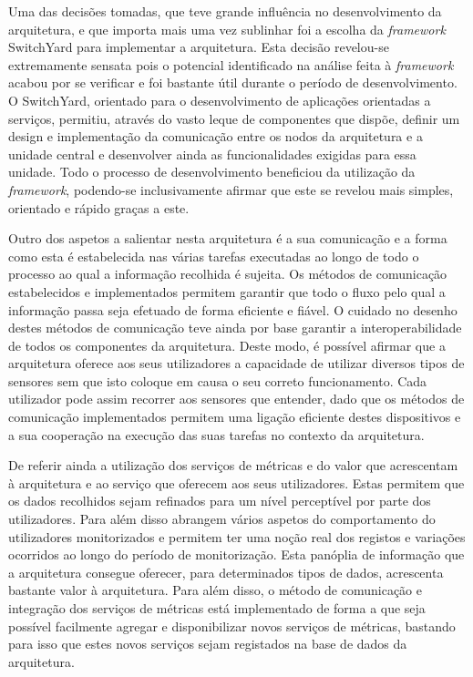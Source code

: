 Uma das decisões tomadas, que teve grande influência no desenvolvimento da arquitetura, e que importa mais uma vez sublinhar foi a escolha da \textit{framework} SwitchYard para implementar a arquitetura. Esta decisão revelou-se extremamente sensata pois o potencial identificado na análise feita à \textit{framework} acabou por se verificar e foi bastante útil durante o período de desenvolvimento. O SwitchYard, orientado para o desenvolvimento de aplicações orientadas a serviços, permitiu, através do vasto leque de componentes que dispõe, definir um design e implementação da comunicação entre os nodos da arquitetura e a unidade central e desenvolver ainda as funcionalidades exigidas para essa unidade. Todo o processo de desenvolvimento beneficiou da utilização da \textit{framework}, podendo-se inclusivamente afirmar que este se revelou mais simples, orientado e rápido graças a este.

Outro dos aspetos a salientar nesta arquitetura é a sua comunicação e a forma como esta é estabelecida nas várias tarefas executadas ao longo de todo o processo ao qual a informação recolhida é sujeita. Os métodos de comunicação estabelecidos e implementados permitem garantir que todo o fluxo pelo qual a informação passa seja efetuado de forma eficiente e fiável. O cuidado no desenho destes métodos de comunicação teve ainda por base garantir a interoperabilidade de todos os componentes da arquitetura. Deste modo, é possível afirmar que a arquitetura oferece aos seus utilizadores a capacidade de utilizar diversos tipos de sensores sem que isto coloque em causa o seu correto funcionamento. Cada utilizador pode assim recorrer aos sensores que entender, dado que os métodos de comunicação implementados permitem uma ligação eficiente destes dispositivos e a sua cooperação na execução das suas tarefas no contexto da arquitetura.

De referir ainda a utilização dos serviços de métricas e do valor que acrescentam à arquitetura e ao serviço que oferecem aos seus utilizadores. Estas permitem que os dados recolhidos sejam refinados para um nível perceptível por parte dos utilizadores. Para além disso abrangem vários aspetos do comportamento do utilizadores monitorizados e permitem ter uma noção real dos registos e variações ocorridos ao longo do período de monitorização. Esta panóplia de informação que a arquitetura consegue oferecer, para determinados tipos de dados, acrescenta bastante valor à arquitetura. Para além disso, o método de comunicação e integração dos serviços de métricas está implementado de forma a que seja possível facilmente agregar e disponibilizar novos serviços de métricas, bastando para isso que estes novos serviços sejam registados na base de dados da arquitetura.


